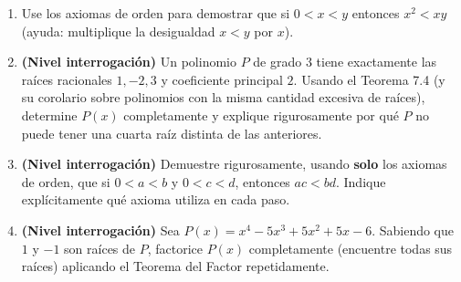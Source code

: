 \documentclass[11pt]{article}
\begin{document}
\begin{enumerate}[label=\arabic*.]
\item Use los axiomas de orden para demostrar que si $0<x<y$ entonces
$x^2 < xy$ (ayuda: multiplique la desigualdad $x<y$ por $x$).

\item \textbf{(Nivel interrogación)} Un polinomio $P$ de grado $3$ tiene exactamente las raíces
racionales $1,-2,3$ y coeficiente principal $2$. Usando el Teorema 7.4 (y su corolario sobre
polinomios con la misma cantidad excesiva de raíces), determine $P(x)$ completamente y explique
rigurosamente por qué $P$ no puede tener una cuarta raíz distinta de las anteriores.

\item \textbf{(Nivel interrogación)} Demuestre rigurosamente, usando \textbf{solo} los axiomas de
orden, que si $0<a<b$ y $0<c<d$, entonces $ac<bd$. Indique explícitamente qué axioma utiliza en
cada paso.

\item \textbf{(Nivel interrogación)} Sea $P(x) = x^4 - 5x^3 + 5x^2 + 5x - 6$. Sabiendo que $1$ y
$-1$ son raíces de $P$, factorice $P(x)$ completamente (encuentre todas sus raíces) aplicando el
Teorema del Factor repetidamente.

\end{enumerate}
\end{document}
